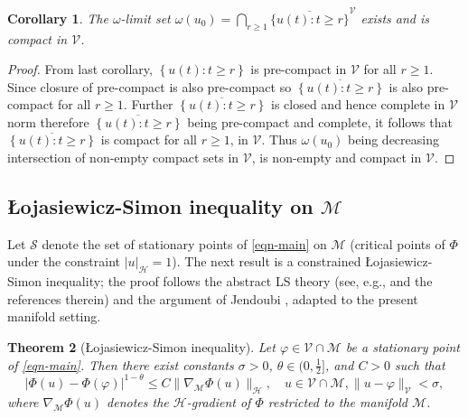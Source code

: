 \documentclass[10pt,a4paper]{amsart}
\numberwithin{equation}{section}
\newtheorem{theorem}{Theorem}[section]
\newtheorem{corollary}[theorem]{Corollary}
\begin{document}
\begin{corollary}\label{omega}
The $\omega$-limit set
$\omega(u_0)=\bigcap_{r\ge1}\overline{\{u(t):t\ge r\}}^{\mathcal{V}}$ exists and
is compact in $\mathcal{V}$.
\end{corollary}

\begin{proof}
From last corollary, $\left\{ u(t):t\geq r\right\} $ is pre-compact in $\mathcal{V}$
for all $r\geq 1$. Since closure of pre-compact is also pre-compact so
$\overline{\left\{ u(t):t\geq r\right\} }$ is also pre-compact for all
 $r\geq1 $. Further $\overline{\left\{ u(t):t\geq r\right\} }$ is closed and hence
complete in $\mathcal{V}$ norm therefore $\overline{\left\{ u(t):t\geq r\right\} }$
being pre-compact and complete, it follows that $\overline{\left\{ u(t):t\geq r\right\} }$ is compact for all $r\geq 1$, in $\mathcal{V}$. Thus $\omega (u_{0})$ being decreasing intersection of
non-empty compact sets in $\mathcal{V}$, is non-empty and compact in $\mathcal{V}$.
\end{proof}

\subsection*{\L{o}jasiewicz-Simon inequality on $\mathcal{M}$}
Let $\mathcal{S}$ denote the set of stationary points of \eqref{eqn-main} on
$\mathcal{M}$ (critical points of $\Phi$ under the constraint $|u|_{\mathcal{H}}=1$).
The next result is a constrained \L{o}jasiewicz-Simon inequality; the proof follows
the abstract LS theory (see, e.g., \cite{Songu} and the references therein) and the
argument of Jendoubi \cite{Jendoubi}, adapted to the present manifold setting.


\begin{theorem}[\L{o}jasiewicz-Simon inequality]\label{Lwoj}
Let $\varphi\in \mathcal V\cap\mathcal M$ be a stationary point of \eqref{eqn-main}.
Then there exist constants $\sigma>0$, $\theta\in(0,\tfrac12]$, and $C>0$ such that
\begin{equation}\label{eq:LS}
|\Phi(u)-\Phi(\varphi)|^{1-\theta}\le C \|\nabla_{\mathcal M}\Phi(u)\|_{\mathcal H},
\quad
u\in \mathcal V\cap\mathcal M, \|u-\varphi\|_{\mathcal V}<\sigma,
\end{equation}
where $\nabla_{\mathcal M}\Phi(u)$ denotes the $\mathcal H$-gradient of $\Phi$
restricted to the manifold $\mathcal M$.
\end{theorem}
\end{document}
